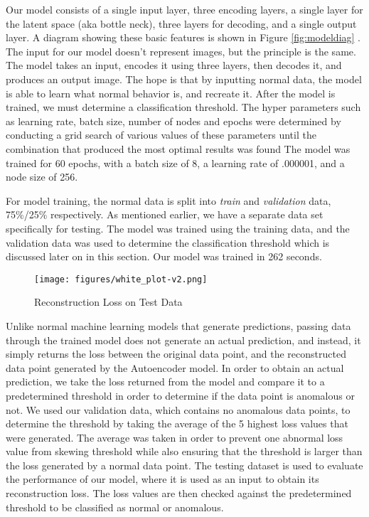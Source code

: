 Our model consists of a single input layer, three encoding layers, a single layer for the latent space (aka bottle neck), three layers for decoding, and a single output layer. A diagram showing these basic features is shown in Figure \ref{fig:modeldiag} \cite{aediag}. The input for our model doesn't represent images, but the principle is the same. The model takes an input, encodes it using three layers, then decodes it, and produces an output image. The hope is that by inputting normal data, the model is able to learn what normal behavior is, and recreate it. After the model is trained, we must determine a classification threshold. The hyper parameters such as learning rate, batch size, number of nodes and epochs were determined by conducting a grid search of various values of these parameters until the combination that produced the most optimal results was found The model was trained for 60 epochs, with a batch size of 8, a learning rate of .000001, and a node size of 256.

For model training, the normal data is split into \textit{train} and \textit{validation} data, 75\%/25\% respectively. As mentioned earlier, we have a separate data set specifically for testing. The model was trained using the training data, and the validation data was used to determine the classification threshold which is discussed later on in this section. Our model was trained in 262 seconds.


\begin{figure*}[!t]
    \centering
    \texttt{[image: figures/white\_plot-v2.png]}
    \caption{Reconstruction Loss on Test Data}
    \label{fig:thresh}
\end{figure*}
Unlike normal machine learning models that generate predictions, passing data through the trained model does not generate an actual prediction, and instead, it simply returns the loss between the original data point, and the reconstructed data point generated by the Autoencoder model. In order to obtain an actual prediction, we take the loss returned from the model and compare it to a predetermined threshold in order to determine if the data point is anomalous or not. We used our validation data, which contains no anomalous data points, to determine the threshold by taking the average of the 5 highest loss values that were generated. The average was taken in order to prevent one abnormal loss value from skewing threshold while also ensuring that the threshold is larger than the loss generated by a normal data point. The testing dataset is used to evaluate the performance of our model, where it is used as an input to obtain its reconstruction loss. The loss values are then checked against the predetermined threshold to be classified as normal or anomalous.


